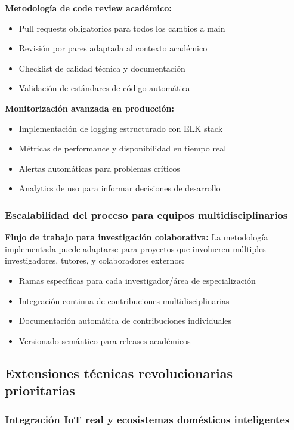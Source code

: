 \textbf{Metodología de code review académico:}
\begin{itemize}
    \item Pull requests obligatorios para todos los cambios a main
    \item Revisión por pares adaptada al contexto académico
    \item Checklist de calidad técnica y documentación
    \item Validación de estándares de código automática
\end{itemize}

\textbf{Monitorización avanzada en producción:}
\begin{itemize}
    \item Implementación de logging estructurado con ELK stack
    \item Métricas de performance y disponibilidad en tiempo real
    \item Alertas automáticas para problemas críticos
    \item Analytics de uso para informar decisiones de desarrollo
\end{itemize}

\subsubsection{Escalabilidad del proceso para equipos multidisciplinarios}

\textbf{Flujo de trabajo para investigación colaborativa:}
La metodología implementada puede adaptarse para proyectos que involucren múltiples investigadores, tutores, y colaboradores externos:

\begin{itemize}
    \item Ramas específicas para cada investigador/área de especialización
    \item Integración continua de contribuciones multidisciplinarias
    \item Documentación automática de contribuciones individuales
    \item Versionado semántico para releases académicos
\end{itemize}

\subsection{Extensiones técnicas revolucionarias prioritarias}

\subsubsection{Integración IoT real y ecosistemas domésticos inteligentes}

